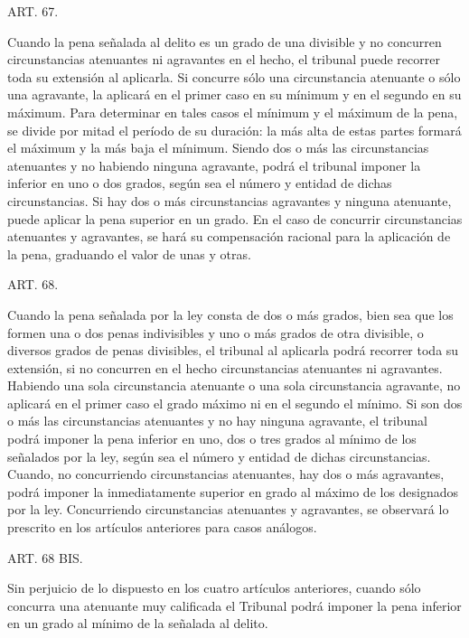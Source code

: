     ART. 67.

    Cuando la pena señalada al delito es un grado de una divisible y no concurren circunstancias atenuantes ni agravantes en el hecho, el tribunal puede recorrer toda su extensión al aplicarla.
    Si concurre sólo una circunstancia atenuante o sólo una agravante, la aplicará en el primer caso en su mínimum y en el segundo en su máximum.
    Para determinar en tales casos el mínimum y el máximum de la pena, se divide por mitad el período de su duración: la más alta de estas partes formará el máximum y la más baja el mínimum.
    Siendo dos o más las circunstancias atenuantes y no habiendo ninguna agravante, podrá el tribunal imponer la inferior en uno o dos grados, según sea el número y entidad de dichas circunstancias.
    Si hay dos o más circunstancias agravantes y ninguna atenuante, puede aplicar la pena superior en un grado.
    En el caso de concurrir circunstancias atenuantes y agravantes, se hará su compensación racional para la aplicación de la pena, graduando el valor de unas y otras.




    ART. 68.

    Cuando la pena señalada por la ley consta de dos o más grados, bien sea que los formen una o dos penas indivisibles y uno o más grados de otra divisible, o diversos grados de penas divisibles, el tribunal al aplicarla podrá recorrer toda su extensión, si no concurren en el hecho circunstancias atenuantes ni agravantes.
    Habiendo una sola circunstancia atenuante o una sola circunstancia agravante, no aplicará en el primer caso el grado máximo ni en el segundo el mínimo.
    Si son dos o más las circunstancias atenuantes y no hay ninguna agravante, el tribunal podrá imponer la pena inferior en uno, dos o tres grados al mínimo de los señalados por la ley, según sea el número y entidad de dichas circunstancias.
    Cuando, no concurriendo circunstancias atenuantes, hay dos o más agravantes, podrá imponer la inmediatamente superior en grado al máximo de los designados por la ley.
    Concurriendo circunstancias atenuantes y agravantes, se observará lo prescrito en los artículos anteriores para casos análogos.



    ART. 68 BIS.

    Sin perjuicio de lo dispuesto en los cuatro artículos anteriores, cuando sólo concurra una atenuante muy calificada el Tribunal podrá imponer la pena inferior en un grado al mínimo de la señalada al delito.

